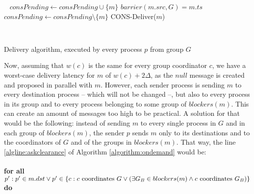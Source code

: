 \documentclass[times, 10pt]{article}
\begin{document}
\begin{algorithm}
\begin{distribalgo}[1]
  \ENDIF  
\ENDINDENT
\blankline\
    \STATE $consPending \leftarrow consPending \cup \{m\}$
  \ENDIF
    \STATE $barrier(m.src, G) = m.ts$
  \ENDIF
\ENDINDENT
\blankline\
  \STATE $consPending \leftarrow consPending \setminus \{m\}$
  \STATE CONS-Deliver($m$)

\blankline\
\ENDINDENT

\caption{Delivery algorithm, executed by every process $p$ from group $G$}
\label{algorithm:ondemand}
\end{distribalgo}
\end{algorithm}

Now, assuming that $w(c)$ is the same for every group coordinator $c$, we have a worst-case delivery latency for $m$ of $w(c) + 2\Delta$, as the $null$ message is created and proposed in parallel with $m$. However, each sender process is sending $m$ to every destination process -- which will not be changed --, but also to every process in its group and to every process belonging to some group of $blockers(m)$. This can create an amount of messages too high to be practical. A solution for that would be the following: instead of sending $m$ to every single process in $G$ and in each group of $blockers(m)$, the sender $p$ sends $m$ only to its destinations and to the coordinators of $G$ and of the groups in $blockers(m)$. That way, the line \ref{algline:askclearance} of Algorithm \ref{algorithm:ondemand} would be:
\\
\\
\textbf{for all} $p' : p' \in m.dst \vee
\\p' \in \{c : c\text{ coordinates }G \vee (\exists G_B \in blockers(m) \wedge c\text{ coordinates }G_B)\}$
\\\textbf{do}

\end{document}
